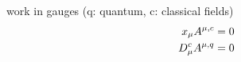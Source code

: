 work in gauges (q: quantum, c: classical fields)
\begin{align}
x_{\mu} A^{\mu,c} = 0
\\
D_\mu^{c} A^{\mu,q} = 0
\end{align}











\ifdefined\mainprogram{}
\else

\fi